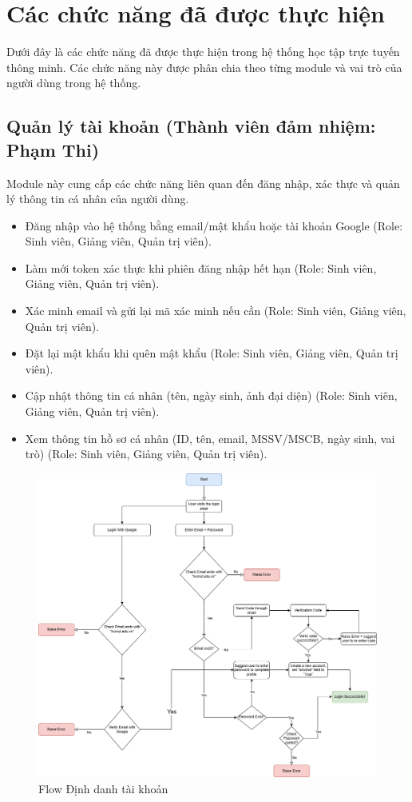 \section{Các chức năng đã được thực hiện}

Dưới đây là các chức năng đã được thực hiện trong hệ thống học tập trực tuyến thông minh. Các chức năng này được phân chia theo từng module và vai trò của người dùng trong hệ thống.

\subsection{Quản lý tài khoản (Thành viên đảm nhiệm: Phạm Thi)}
Module này cung cấp các chức năng liên quan đến đăng nhập, xác thực và quản lý thông tin cá nhân của người dùng.
\begin{itemize}[label=--]
    \item Đăng nhập vào hệ thống bằng email/mật khẩu hoặc tài khoản Google (Role: Sinh viên, Giảng viên, Quản trị viên).
    \item Làm mới token xác thực khi phiên đăng nhập hết hạn (Role: Sinh viên, Giảng viên, Quản trị viên).
    \item Xác minh email và gửi lại mã xác minh nếu cần (Role: Sinh viên, Giảng viên, Quản trị viên).
    \item Đặt lại mật khẩu khi quên mật khẩu (Role: Sinh viên, Giảng viên, Quản trị viên).
    \item Cập nhật thông tin cá nhân (tên, ngày sinh, ảnh đại diện) (Role: Sinh viên, Giảng viên, Quản trị viên).
    \item Xem thông tin hồ sơ cá nhân (ID, tên, email, MSSV/MSCB, ngày sinh, vai trò) (Role: Sinh viên, Giảng viên, Quản trị viên).
\end{itemize}

\begin{figure}[H]
    \centering
    \includegraphics[width=0.9\linewidth]{images/Quan_ly_tai_khoan/authenFlow.drawio.png}
    \caption{Flow Định danh tài khoản}
    \label{fig:enter-label}
\end{figure}

